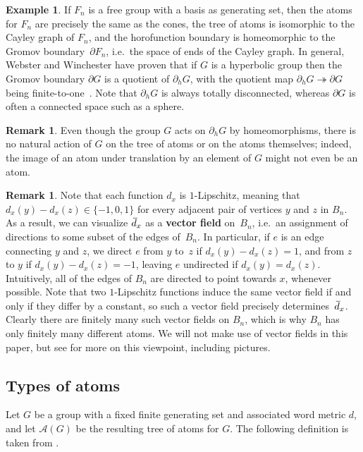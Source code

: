 \documentclass[11pt,letterpaper]{amsart}
\theoremstyle{definition}
\newtheorem{remark}[theorem]{Remark}
\newtheorem{example}[theorem]{Example}
\newcommand{\newword}[1]{\textbf{#1}}
\newcommand{\A}{\mathcal{A}}
\newcommand{\od}{\mkern 3mu\overline{\mkern-3mu d\mkern 1.5mu}\mkern-1.5mu}
\begin{document}
\begin{example}
If $F_n$ is a free group with a basis as generating set, then the atoms for $F_n$ are precisely the same as the cones, the tree of atoms is isomorphic to the Cayley graph of $F_n$, and the horofunction boundary is homeomorphic to the Gromov boundary~$\partial F_n$, i.e.\ the space of ends of the Cayley graph. In general, Webster and Winchester have proven that if $G$ is a hyperbolic group then the Gromov boundary $\partial G$ is a quotient of $\partial_h G$, with the quotient map $\partial_h G\twoheadrightarrow \partial G$ being finite-to-one~\cite{WeWi}.  Note that $\partial_h G$ is always totally disconnected, whereas $\partial G$ is often a connected space such as a sphere.
\end{example}

\begin{remark}
Even though the group $G$ acts on $\partial_h G$ by homeomorphisms, there is no natural action of $G$ on the tree of atoms or on the atoms themselves; indeed, the image of an atom under translation by an element of $G$ might not even be an atom.
\end{remark}

\begin{remark}
Note that each function $d_x$ is $1$-Lipschitz, meaning that $d_x(y)-d_x(z) \in \{-1,0,1\}$ for every adjacent pair of vertices $y$ and $z$ in $B_n$.  As a result, we can visualize $\od_x$ as a \newword{vector field} on~$B_n$, i.e.\ an assignment of directions to some subset of the edges of~$B_n$.  In particular, if $e$ is an edge connecting $y$ and $z$, we direct $e$ from $y$ to~$z$ if $d_x(y)-d_x(z)=1$, and from $z$ to $y$ if $d_x(y)-d_x(z)=-1$, leaving $e$ undirected if $d_x(y)=d_x(z)$.  Intuitively, all of the edges of $B_n$ are directed to point towards $x$, whenever possible.  Note that two $1$-Lipschitz functions induce the same vector field if and only if they differ by a constant, so such a vector field precisely determines~$\od_x$.  Clearly there are finitely many such vector fields on $B_n$, which is why $B_n$ has only finitely many different atoms. We will not make use of vector fields in this paper, but see \cite{BelkBleakRIMS} for more on this viewpoint, including pictures.
\end{remark}


\subsection{Types of atoms}\label{ssec:TypesOfAtoms}
Let $G$ be a group with a fixed finite generating set and associated word metric $d$, and let $\A(G)$ be the resulting tree of atoms for $G$.  The following definition is taken from \cite[Definition~3.7]{BelkBleakMatucci}.
\end{document}
